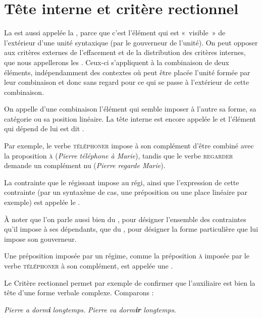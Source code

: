 \section{Tête interne et critère rectionnel}\label{sec:3.3.16}

La  est aussi appelée la , parce que c’est l’élément qui est «~visible~» de l’extérieur d’une unité syntaxique (par le gouverneur de l'unité). On peut opposer aux critères externes de l’effacement et de la distribution des critères internes, que nous appellerons les . Ceux-ci s’appliquent à la combinaison de deux éléments, indépendamment des contextes où peut être placée l’unité formée par leur combinaison et donc sans regard pour ce qui se passe à l’extérieur de cette combinaison.

{On appelle  d’une combinaison l’élément qui semble imposer à l’autre sa forme, sa catégorie ou sa position linéaire. La tête interne est encore appelée le  et l’élément qui dépend de lui est dit .}

Par exemple, le verbe \textsc{téléphoner} impose à son complément d’être combiné avec la proposition \textsc{à} (\textit{Pierre téléphone à Marie}), tandis que le verbe \textsc{regarder} demande un complément nu (\textit{Pierre regarde Marie}).%

{La contrainte que le régissant impose au régi, ainsi que l'expression de cette contrainte (par un syntaxème de cas, une préposition ou une place linéaire par exemple) est appelée le . 

À noter que l’on parle aussi bien du , pour désigner l’ensemble des contraintes qu’il impose à ses dépendants, que du , pour désigner la forme particulière que lui impose son gouverneur.}

Une préposition imposée par un régime, comme la préposition \textsc{à} imposée par le verbe \textsc{téléphoner} à son complément, est appelée une .

Le Critère rectionnel permet par exemple de confirmer que l’auxiliaire est bien la tête d’une forme verbale complexe. Comparons :

\ea
  \ea \textit{Pierre a dorm\textbf{i}  longtemps.}
  \ex \textit{Pierre va dorm\textbf{ir}  longtemps.}
  \z
\z

